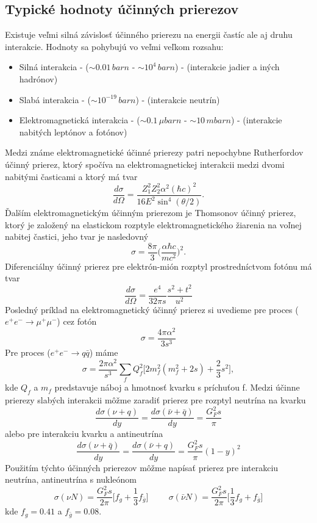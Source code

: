 \documentclass[../../main.tex]{subfiles}
\begin{document}
\subsection{Typické hodnoty účinných prierezov}
Existuje veľmi silná závislosť účinného prierezu na energii častíc ale aj druhu interakcie. Hodnoty sa pohybujú vo veľmi veľkom rozsahu:
\begin{itemize}
\item Silná interakcia - ($\sim 0.01\,barn$ - $\sim 10^4\,barn$) - (interakcie jadier a iných hadrónov)
\item Slabá interakcia - ($\sim 10^{-19}\,barn$) - (interakcie neutrín)
\item Elektromagnetická interakcia - ($\sim 0.1\,\mu barn$ - $\sim 10\,mbarn$) - (interakcie nabitých leptónov a fotónov)
\end{itemize} 

Medzi známe elektromagnetické účinné prierezy patri nepochybne Rutherfordov účinný prierez, ktorý spočíva na elektromagnetickej interakcii medzi dvomi nabitými časticami a ktorý má tvar
$$ \frac{d\sigma}{d\Omega} = \frac{Z_1^2Z_2^2\alpha^2(\hbar c)^2}{16E^2\sin^4(\theta/2)}.$$
Ďalším elektromagnetickým účinným prierezom je Thomsonov účinný prierez, ktorý je založený na elastickom rozptyle elektromagnetického žiarenia na voľnej nabitej častici, jeho tvar je nasledovný
$$ \sigma = \frac{8\pi}{3} \bigg(\frac{\alpha \hbar c}{mc^2} \bigg)^2.$$ 
Diferenciálny účinný prierez pre elektrón-mión rozptyl prostredníctvom fotónu má tvar
$$ \frac{d\sigma}{d\Omega} = \frac{e^4}{32\pi s}\frac{s^2+t^2}{u^2} $$
Posledný príklad na elektromagnetický účinný prierez si uvedieme pre proces ($e^+e^- \rightarrow \mu^+ \mu^-$) cez fotón
$$ \sigma = \frac{4 \pi \alpha^2}{3s^3} $$
Pre proces ($ e^+e^- \rightarrow q \bar{q} $) máme 
$$ \sigma = \frac{2\pi \alpha^2}{s^3} \sum_f Q^2_f \bigg[ 2m_f^2(m^2_f+2s)+\frac{2}{3}s^2 \bigg], $$
kde $Q_f$ a $m_f$ predstavuje náboj a hmotnosť kvarku s príchuťou f.
Medzi účinne prierezy slabých interakcii môžme zaradiť prierez pre rozptyl neutrína na kvarku
$$ \frac{d\sigma(\nu+q)}{dy} = \frac{d\sigma(\bar{\nu}+\bar{q})}{dy} = \frac{G_F^2s}{\pi} $$
alebo pre interakciu kvarku a antineutrína
$$ \frac{d\sigma(\nu+\bar{q})}{dy} = \frac{d\sigma(\bar{\nu}+q)}{dy} = \frac{G_F^2s}{\pi}(1-y)^2 $$
Použitím týchto účinných prierezov môžme napísať prierez pre interakciu neutrína, antineutrína s nukleónom
$$\sigma(\nu N )=\frac{G_F^2s}{2\pi} \bigg[f_g+\frac{1}{3}f_{\bar{g}} \bigg] \hspace{1cm} \sigma(\bar{\nu} N )=\frac{G_F^2s}{2\pi} \bigg[\frac{1}{3}f_g+f_{\bar{g}} \bigg] $$
kde $f_g=0.41$ a $f_{\bar{g}}=0.08$.
\end{document}

